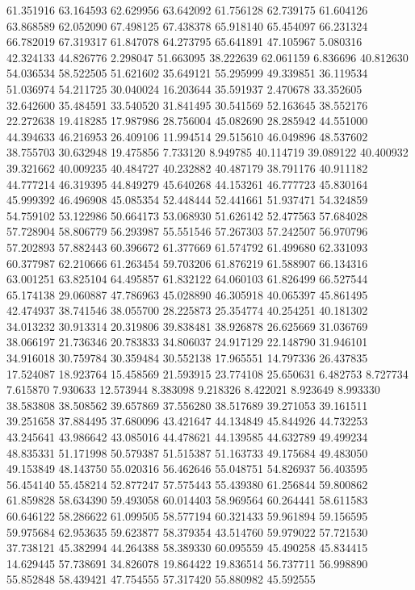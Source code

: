61.351916
63.164593
62.629956
63.642092
61.756128
62.739175
61.604126
63.868589
62.052090
67.498125
67.438378
65.918140
65.454097
66.231324
66.782019
67.319317
61.847078
64.273795
65.641891
47.105967
5.080316
42.324133
44.826776
2.298047
51.663095
38.222639
62.061159
6.836696
40.812630
54.036534
58.522505
51.621602
35.649121
55.295999
49.339851
36.119534
51.036974
54.211725
30.040024
16.203644
35.591937
2.470678
33.352605
32.642600
35.484591
33.540520
31.841495
30.541569
52.163645
38.552176
22.272638
19.418285
17.987986
28.756004
45.082690
28.285942
44.551000
44.394633
46.216953
26.409106
11.994514
29.515610
46.049896
48.537602
38.755703
30.632948
19.475856
7.733120
8.949785
40.114719
39.089122
40.400932
39.321662
40.009235
40.484727
40.232882
40.487179
38.791176
40.911182
44.777214
46.319395
44.849279
45.640268
44.153261
46.777723
45.830164
45.999392
46.496908
45.085354
52.448444
52.441661
51.937471
54.324859
54.759102
53.122986
50.664173
53.068930
51.626142
52.477563
57.684028
57.728904
58.806779
56.293987
55.551546
57.267303
57.242507
56.970796
57.202893
57.882443
60.396672
61.377669
61.574792
61.499680
62.331093
60.377987
62.210666
61.263454
59.703206
61.876219
61.588907
66.134316
63.001251
63.825104
64.495857
61.832122
64.060103
61.826499
66.527544
65.174138
29.060887
47.786963
45.028890
46.305918
40.065397
45.861495
42.474937
38.741546
38.055700
28.225873
25.354774
40.254251
40.181302
34.013232
30.913314
20.319806
39.838481
38.926878
26.625669
31.036769
38.066197
21.736346
20.783833
34.806037
24.917129
22.148790
31.946101
34.916018
30.759784
30.359484
30.552138
17.965551
14.797336
26.437835
17.524087
18.923764
15.458569
21.593915
23.774108
25.650631
6.482753
8.727734
7.615870
7.930633
12.573944
8.383098
9.218326
8.422021
8.923649
8.993330
38.583808
38.508562
39.657869
37.556280
38.517689
39.271053
39.161511
39.251658
37.884495
37.680096
43.421647
44.134849
45.844926
44.732253
43.245641
43.986642
43.085016
44.478621
44.139585
44.632789
49.499234
48.835331
51.171998
50.579387
51.515387
51.163733
49.175684
49.483050
49.153849
48.143750
55.020316
56.462646
55.048751
54.826937
56.403595
56.454140
55.458214
52.877247
57.575443
55.439380
61.256844
59.800862
61.859828
58.634390
59.493058
60.014403
58.969564
60.264441
58.611583
60.646122
58.286622
61.099505
58.577194
60.321433
59.961894
59.156595
59.975684
62.953635
59.623877
58.379354
43.514760
59.979022
57.721530
37.738121
45.382994
44.264388
58.389330
60.095559
45.490258
45.834415
14.629445
57.738691
34.826078
19.864422
19.836514
56.737711
56.998890
55.852848
58.439421
47.754555
57.317420
55.880982
45.592555

